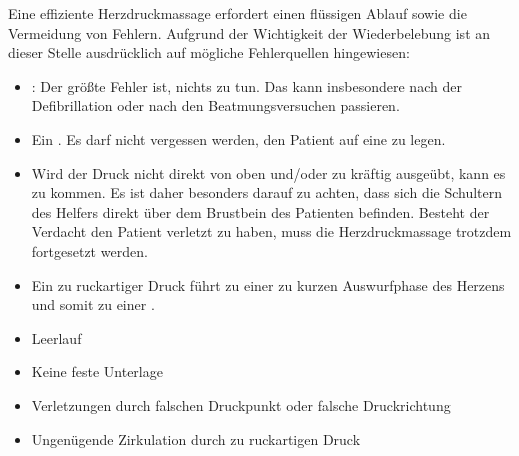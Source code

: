 {
%
%
%
Eine effiziente Herzdruckmassage erfordert einen flüssigen Ablauf 
sowie die Vermeidung von Fehlern. 
Aufgrund der Wichtigkeit der Wiederbelebung ist an dieser Stelle ausdrücklich auf mögliche Fehlerquellen hingewiesen:
\begin{itemize}
	\item {}: Der größte Fehler ist, nichts zu tun. 
	Das kann insbesondere nach der Defibrillation oder nach den Beatmungsversuchen passieren.
	\item Ein . 
	Es darf nicht vergessen werden, den Patient auf eine  zu legen.
	\item Wird der Druck nicht direkt von oben und/oder zu kräftig ausgeübt, 
	kann es zu  kommen. 
	Es ist daher besonders darauf zu achten, 
	dass sich die Schultern des Helfers direkt über dem Brustbein des Patienten befinden. 
	Besteht der Verdacht den Patient verletzt zu haben, 
	muss die Herzdruckmassage trotzdem fortgesetzt werden.
	\item Ein zu ruckartiger Druck führt zu einer zu kurzen Auswurfphase des Herzens 
	und somit zu einer .
\end{itemize}
}{
\begin{itemize}
  \item Leerlauf
  \item Keine feste Unterlage
  \item Verletzungen durch falschen Druckpunkt oder falsche
  Druckrichtung
  \item Ungenügende Zirkulation durch zu ruckartigen Druck
\end{itemize}
}{}{}{}


